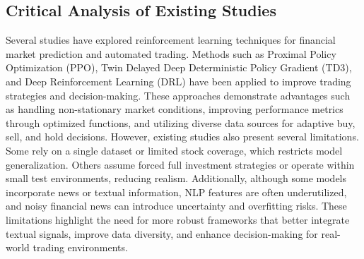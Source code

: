 \documentclass[a4paper,fleqn]{cas-sc}
\begin{document}
\subsection{Critical Analysis of Existing Studies  }\label{sec:Critical}
Several studies have explored reinforcement learning techniques for financial market prediction and automated trading. Methods such as Proximal Policy Optimization (PPO), Twin Delayed Deep Deterministic Policy Gradient (TD3), and Deep Reinforcement Learning (DRL) have been applied to improve trading strategies and decision-making. These approaches demonstrate advantages such as handling non-stationary market conditions, improving performance metrics through optimized functions, and utilizing diverse data sources for adaptive buy, sell, and hold decisions. However, existing studies also present several limitations. Some rely on a single dataset or limited stock coverage, which restricts model generalization. Others assume forced full investment strategies or operate within small test environments, reducing realism. Additionally, although some models incorporate news or textual information, NLP features are often underutilized, and noisy financial news can introduce uncertainty and overfitting risks. These limitations highlight the need for more robust frameworks that better integrate textual signals, improve data diversity, and enhance decision-making for real-world trading environments.
\par\medskip
\begingroup
\noindent{}\label{tbl:critical-summary}
\par\smallskip
\centering
\small
\setlength{\tabcolsep}{4pt}
\renewcommand{\arraystretch}{1.15}
\end{document}
